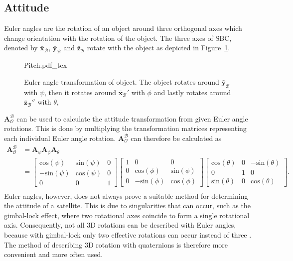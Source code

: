 \subsection{Attitude}
\label{subsection_quaternions}
Euler angles are the rotation of an object around three orthogonal axes which change orientation with the rotation of the object. The three axes of SBC, denoted by $\bar{\mathbf{x}}_{\mathcal{B}}$, $\bar{\mathbf{y}}_{\mathcal{B}}$ and $\bar{\mathbf{z}}_{\mathcal{B}}$ rotate with the object as depicted in Figure~\ref{fig:Pitch}.
\begin{figure}[!htb]
	\centering
	\def\svgwidth{10cm}
	{Pitch.pdf_tex}
	\caption{Euler angle transformation of object. The object rotates around $\bar{\mathbf{y}}_\mathcal{B}$ with $\psi$, then it rotates around $\bar{\mathbf{x}}_\mathcal{B}'$ with $\phi$ and lastly rotates around $\bar{\mathbf{z}}_\mathcal{B}''$ with $\theta$,}
	\label{fig:Pitch}
\end{figure}

$\boldsymbol{A}^{\mathcal{B}}_{\mathcal{O}}$ can be used to calculate the attitude transformation from given Euler angle rotations. This is done by multiplying the transformation matrices representing each individual Euler angle rotation. $\boldsymbol{A}^{\mathcal{B}}_{\mathcal{O}}$ can therefore be calculated as 
\begin{equation}
	\begin{aligned}
		\boldsymbol{A}^{\mathcal{B}}_{\mathcal{O}} &= \boldsymbol{A}_{\psi} \boldsymbol{A}_{\phi} \boldsymbol{A}_{\theta} \\
			&= \begin{bmatrix}
			\text{cos}(\psi) & \text{sin}(\psi) & 0 \\
			-\text{sin}(\psi) & \text{cos}(\psi) & 0 \\
			0 & 0 & 1
			\end{bmatrix} \begin{bmatrix}
			1 & 0 & 0 \\
			0 & \text{cos}(\phi) & \text{sin}(\phi) \\
			0 & -\text{sin}(\phi) & \text{cos}(\phi)
			\end{bmatrix} \begin{bmatrix}
			\text{cos}(\theta) &  0 & -\text{sin}(\theta) \\
			0 & 1 & 0 \\
			\text{sin}(\theta) & 0 & \text{cos}(\theta)
			\end{bmatrix}. \\
	\end{aligned}
\end{equation}
Euler angles, however, does not always prove a suitable method for determining the attitude of a satellite. This is due to singularities that can occur, such as the gimbal-lock effect, where two rotational axes coincide to form a single rotational axis. Consequently, not all $3$D rotations can be described with Euler angles, because with gimbal-lock only two effective rotations can occur instead of three \cite{diebel2006representing}. The method of describing $3$D rotation with quaternions is therefore more convenient and more often used. 

